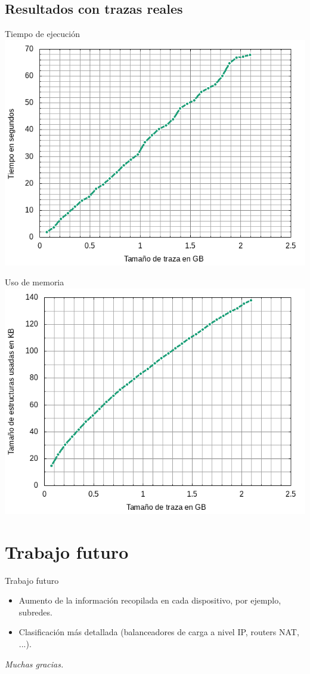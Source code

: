\documentclass{beamer}
\begin{document}
\subsection{Resultados con trazas reales}
\begin{frame}{Tiempo de ejecución}
\centering
\includegraphics[scale=0.5]{gnuplot/png/time_ordering.png}
\end{frame}

\begin{frame}{Uso de memoria}
\centering
\includegraphics[scale=0.5]{gnuplot/png/memory-usage.png}
    
\end{frame}

\section{Trabajo futuro}
\begin{frame}{Trabajo futuro}
\begin{itemize}
    \item Aumento de la información recopilada en cada dispositivo, por ejemplo, subredes.
    \item Clasificación más detallada (balanceadores de carga a nivel IP, routers NAT, ...).
\end{itemize}
    
\end{frame}

\begin{frame}{}
  \centering \huge
  \emph{Muchas gracias.}
\end{frame}
\end{document}
